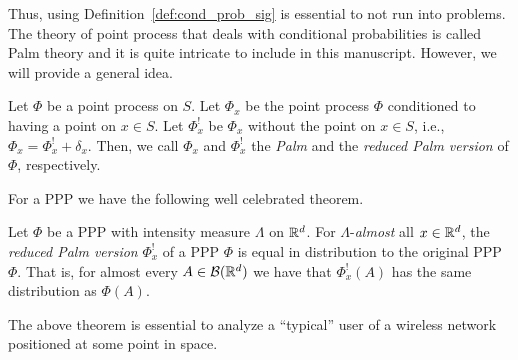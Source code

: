 Thus, using Definition~\ref{def:cond_prob_sig} is essential to not run into problems.
%
The theory of point process that deals with conditional probabilities is called Palm theory and it is quite intricate to include in this manuscript. However, we will provide a general idea.

\begin{definition}
    Let $\Phi$ be a point process on $S$.
    Let $\Phi_x$ be the point process $\Phi$ conditioned to having a point on $x\in S$. Let $\Phi^!_x$ be $\Phi_x$ without the point on $x\in S$, i.e., $\Phi_x = \Phi^!_x + \delta_x$.
    Then, we call $\Phi_x$ and $\Phi^!_x$ the \textit{Palm} and the \textit{reduced Palm version} of $\Phi$, respectively.
\end{definition}

%

For a PPP we have the following well celebrated theorem.
\begin{theorem} \label{th:slivnyak}
    Let $\Phi$ be a PPP with intensity measure $\Lambda$ on ${\mathbb R}^d$.
    For $\Lambda$-\textit{almost} all $x\in{\mathbb R}^d$, the \textit{reduced Palm version} $\Phi^!_x$ of a PPP $\Phi$ is equal in distribution to the original PPP $\Phi$.
    That is, for almost every $A\in\mathcal{B}({\mathbb R}^d)$ we have that $\Phi^!_x(A)$ has the same distribution as $\Phi(A)$.
\end{theorem}
%
The above theorem is essential to analyze a ``typical'' user of a wireless network positioned at some point in space.

